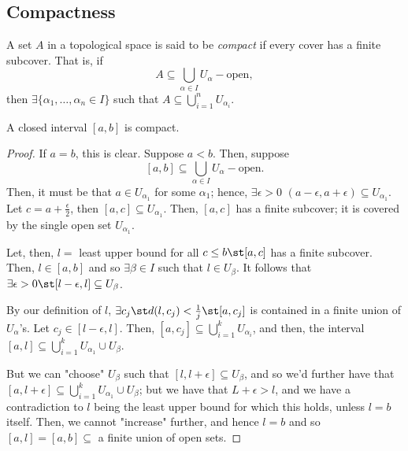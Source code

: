 \subsection{Compactness}

\begin{definition}[Compact]
        A set $A$ in a topological space is said to be \emph{compact} if every cover has a finite subcover. That is, if \[
        A \subseteq \bigcup_{\alpha \in I} U_\alpha-\text{open},    
        \]
        then $\exists \{\alpha_1, \dots, \alpha_n \in I\}$ such that $A \subseteq \bigcup_{i=1}^n U_{\alpha_i}$.
\end{definition}

\begin{proposition}\label{prop:closedcompact}
    A closed interval $[a, b]$ is compact.
\end{proposition}

\begin{proof}
    If $a = b$, this is clear. Suppose $a < b$. Then, suppose \[
    [a, b] \subseteq \bigcup_{\alpha \in I} U_\alpha-\text{open}.    
    \]
    Then, it must be that $a \in U_{\alpha_1}$ for some $\alpha_1$; hence, $\exists \epsilon > 0$ $(a - \epsilon, a + \epsilon) \subseteq U_{\alpha_1}$. Let $c = a + \frac{\epsilon}{2}$, then $[a, c] \subseteq U_{\alpha_1}$. Then, $[a,c]$ has a finite subcover; it is covered by the single open set $U_{\alpha_1}$.

    Let, then, $l = $ least upper bound for all $c\leq b \st [a, c]$ has a finite subcover. Then, $l \in [a,b]$ and so $\exists \beta \in I$ such that $l \in U_\beta$. It follows that $\exists \epsilon > 0 \st [l - \epsilon, l] \subseteq U_\beta$. 

    By our definition of $l$, $\exists c_j \st d(l, c_j) < \frac{1}{j} \st [a, c_j]$ is contained in a finite union of $U_\alpha$'s. Let $c_j \in [l-\epsilon, l]$. Then, $[a, c_j] \subseteq \bigcup_{i=1}^{k} U_{\alpha_i}$, and then, the interval $[a, l] \subseteq \bigcup_{i=1}^{k}U_{\alpha_1} \cup U_{\beta}$. 
    
    But we can "choose" $U_\beta$ such that $[l, l + \epsilon] \subseteq U_\beta$, and so we'd further have that $[a, l + \epsilon] \subseteq \bigcup_{i=1}^{k}U_{\alpha_1} \cup U_{\beta}$; but we have that $L + \epsilon > l$, and we have a contradiction to $l$ being the least upper bound for which this holds, unless $l = b$ itself. Then, we cannot "increase" further, and hence $l = b$ and so $[a, l] = [a, b] \subseteq$ a finite union of open sets.
\end{proof}

